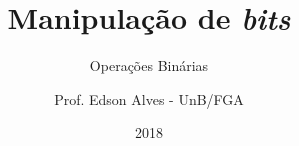 \title{Manipulação de \textit{bits}}
\subtitle{Operações Binárias}
\author{Prof. Edson Alves - UnB/FGA}
\date{2018}
